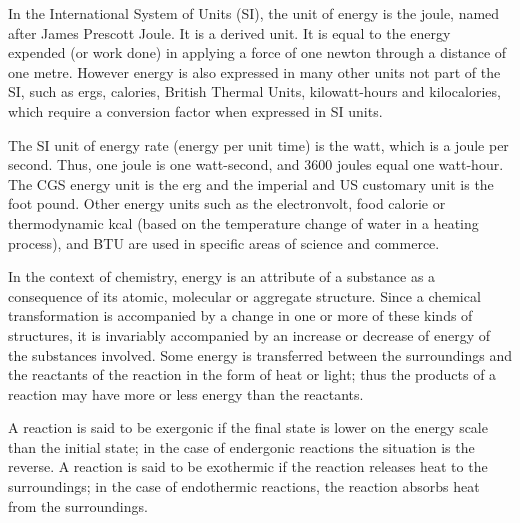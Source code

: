 \documentclass[
]{book}
\begin{document}
In the International System of Units (SI), the unit of energy is the joule, named after James Prescott Joule. It is a derived unit. It is equal to the energy expended (or work done) in applying a force of one newton through a distance of one metre. However energy is also expressed in many other units not part of the SI, such as ergs, calories, British Thermal Units, kilowatt-hours and kilocalories, which require a conversion factor when expressed in SI units.

The SI unit of energy rate (energy per unit time) is the watt, which is a joule per second. Thus, one joule is one watt-second, and 3600 joules equal one watt-hour. The CGS energy unit is the erg and the imperial and US customary unit is the foot pound. Other energy units such as the electronvolt, food calorie or thermodynamic kcal (based on the temperature change of water in a heating process), and BTU are used in specific areas of science and commerce.

In the context of chemistry, energy is an attribute of a substance as a consequence of its atomic, molecular or aggregate structure. Since a chemical transformation is accompanied by a change in one or more of these kinds of structures, it is invariably accompanied by an increase or decrease of energy of the substances involved. Some energy is transferred between the surroundings and the reactants of the reaction in the form of heat or light; thus the products of a reaction may have more or less energy than the reactants.

A reaction is said to be exergonic if the final state is lower on the energy scale than the initial state; in the case of endergonic reactions the situation is the reverse. A reaction is said to be exothermic if the reaction releases heat to the surroundings; in the case of endothermic reactions, the reaction absorbs heat from the surroundings.
\end{document}
